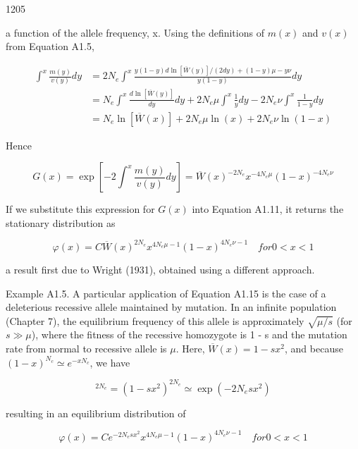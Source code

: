 \documentclass{article}
\begin{document}
1205

a function of the allele frequency, x. Using the definitions of  $ m(x) $ and  $ v(x) $ from Equation A1.5,

\begin{equation}
\begin{aligned}\int^{x}\frac{m(y)}{v(y)}dy&=2N_{e}\int^{x}\frac{y(1-y)d\ln[\overline{W}(y)]/(2dy)+(1-y)\mu-y\nu}{y(1-y)}dy\\&=N_{e}\int^{x}\frac{d\ln[\overline{W}(y)]}{dy}dy+2N_{e}\mu\int^{x}\frac{1}{y}dy-2N_{e}\nu\int^{x}\frac{1}{1-y}dy\\&=N_{e}\ln[\overline{W}(x)]+2N_{e}\mu\ln(x)+2N_{e}\nu\ln(1-x)\end{aligned}
\end{equation}

Hence

\begin{equation}
G(x)=\exp\left[-2\int_{}^{x}\frac{m(y)}{v(y)}d y\right]=\overline{W}(x)^{-2N_{e}}x^{-4N_{e}\mu}\left(1-x\right)^{-4N_{e}\nu}
\end{equation}

If we substitute this expression for  $ G(x) $ into Equation A1.11, it returns the stationary distribution as

\begin{equation}
\varphi(x)=C\overline{W}(x)^{2N_{e}}x^{4N_{e}\mu-1}\left(1-x\right)^{4N_{e}\nu-1}\quad for0<x<1
\end{equation}

a result first due to Wright (1931), obtained using a different approach.

Example A1.5. A particular application of Equation A1.15 is the case of a deleterious recessive allele maintained by mutation. In an infinite population (Chapter 7), the equilibrium frequency of this allele is approximately  $ \sqrt{\mu/s} $ (for  $ s \gg \mu $), where the fitness of the recessive homozygote is 1 - s and the mutation rate from normal to recessive allele is  $ \mu $. Here,  $ \overline{W}(x) = 1 - s x^2 $, and because  $ (1 - x)^{N_c} \simeq e^{-x N_c} $, we have

\begin{equation}
[\overline{{W}}(x)]^{2N_{e}}=(1-s x^{2})^{2N_{e}}\simeq\exp(-2N_{e}s x^{2})
\end{equation}

resulting in an equilibrium distribution of

\begin{equation}
\varphi(x)=C e^{-2N_{e}s x^{2}}x^{4N_{e}\mu-1}\left(1-x\right)^{4N_{e}\nu-1}\quad for0<x<1
\end{equation}
\end{document}

